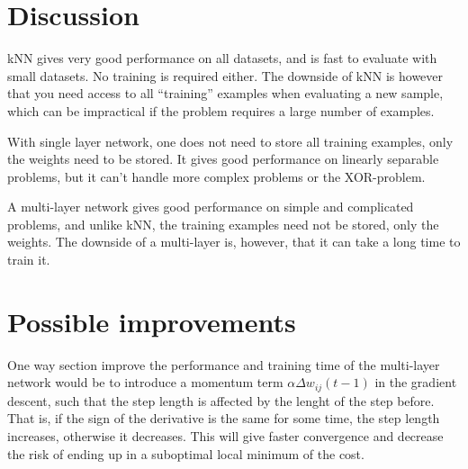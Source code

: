 \documentclass{article}
\begin{document}
\section{Discussion}

kNN gives very good performance on all datasets, and is fast to evaluate with
small datasets. No
training is required either. The downside of kNN is however that you need
access to all ``training'' examples when evaluating a new sample, which can be
impractical if the problem requires a large number of examples.

With single layer network, one does not need to store all training examples,
only the weights need to be stored. It gives good performance on linearly
separable problems, but it can't handle more complex problems or the
XOR-problem.

A multi-layer network gives good performance on simple and complicated
problems, and unlike kNN, the training examples need not be stored, only
the weights. The downside of a multi-layer is, however, that it can take
a long time to train it.

\section{Possible improvements}

One way section improve the performance and training time of the multi-layer
network would be to introduce a momentum term 
$\alpha\Delta w_{ij}(t - 1)$ in the gradient descent, such that the step
length is affected by the lenght of the step before. That is, if the
sign of the derivative is the same for some time, the step length
increases, otherwise it decreases. This will give faster convergence
and decrease the risk of ending up in a suboptimal local minimum of the
cost.
\end{document}
